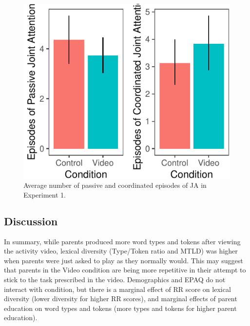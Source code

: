 \documentclass[]{article}
\begin{document}
\begin{figure}[H]

{\centering \includegraphics{figs/e1ja-graphs-pass-coord-1} 

}

\caption{Average number of passive and coordinated episodes of JA in Experiment 1.}\label{fig:e1ja-graphs-pass-coord}
\end{figure}

\hypertarget{discussion}{%
\subsection{Discussion}\label{discussion}}

In summary, while parents produced more word types and tokens after
viewing the activity video, lexical diversity (Type/Token ratio and
MTLD) was higher when parents were just asked to play as they normally
would. This may suggest that parents in the Video condition are being
more repetitive in their attempt to stick to the task prescribed in the
video. Demographics and EPAQ do not interact with condition, but there
is a marginal effect of RR score on lexical diversity (lower diversity
for higher RR scores), and marginal effects of parent education on word
types and tokens (more types and tokens for higher parent education).
\end{document}
